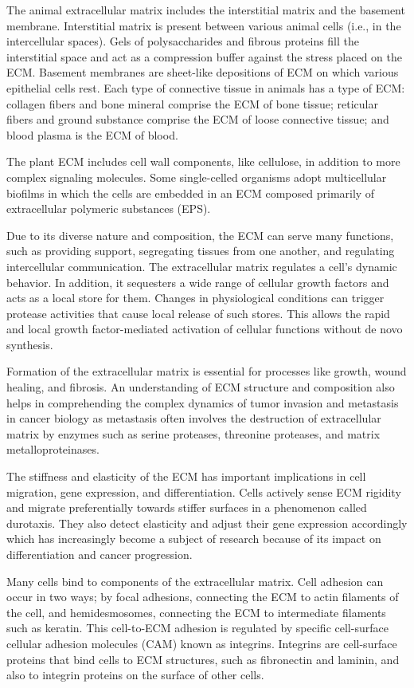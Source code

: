 \documentclass[
]{book}
\begin{document}
The animal extracellular matrix includes the interstitial matrix and the basement membrane. Interstitial matrix is present between various animal cells (i.e., in the intercellular spaces). Gels of polysaccharides and fibrous proteins fill the interstitial space and act as a compression buffer against the stress placed on the ECM. Basement membranes are sheet-like depositions of ECM on which various epithelial cells rest. Each type of connective tissue in animals has a type of ECM: collagen fibers and bone mineral comprise the ECM of bone tissue; reticular fibers and ground substance comprise the ECM of loose connective tissue; and blood plasma is the ECM of blood.

The plant ECM includes cell wall components, like cellulose, in addition to more complex signaling molecules. Some single-celled organisms adopt multicellular biofilms in which the cells are embedded in an ECM composed primarily of extracellular polymeric substances (EPS).

Due to its diverse nature and composition, the ECM can serve many functions, such as providing support, segregating tissues from one another, and regulating intercellular communication. The extracellular matrix regulates a cell's dynamic behavior. In addition, it sequesters a wide range of cellular growth factors and acts as a local store for them. Changes in physiological conditions can trigger protease activities that cause local release of such stores. This allows the rapid and local growth factor-mediated activation of cellular functions without de novo synthesis.

Formation of the extracellular matrix is essential for processes like growth, wound healing, and fibrosis. An understanding of ECM structure and composition also helps in comprehending the complex dynamics of tumor invasion and metastasis in cancer biology as metastasis often involves the destruction of extracellular matrix by enzymes such as serine proteases, threonine proteases, and matrix metalloproteinases.

The stiffness and elasticity of the ECM has important implications in cell migration, gene expression, and differentiation. Cells actively sense ECM rigidity and migrate preferentially towards stiffer surfaces in a phenomenon called durotaxis. They also detect elasticity and adjust their gene expression accordingly which has increasingly become a subject of research because of its impact on differentiation and cancer progression.

Many cells bind to components of the extracellular matrix. Cell adhesion can occur in two ways; by focal adhesions, connecting the ECM to actin filaments of the cell, and hemidesmosomes, connecting the ECM to intermediate filaments such as keratin. This cell-to-ECM adhesion is regulated by specific cell-surface cellular adhesion molecules (CAM) known as integrins. Integrins are cell-surface proteins that bind cells to ECM structures, such as fibronectin and laminin, and also to integrin proteins on the surface of other cells.
\end{document}

